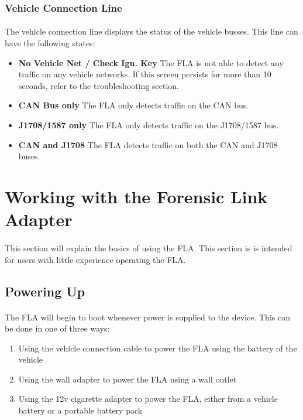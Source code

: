 \documentclass[11pt, oneside]{book}
\begin{document}
\subsubsection{Vehicle Connection Line}
\paragraph{  }
The vehicle connection line displays the status of the vehicle busses.
This line can have the following states:
\begin{itemize}
\item \textbf{No Vehicle Net / Check Ign. Key} The FLA is not able to detect
any traffic on any vehicle networks. If this screen persists for more
than 10 seconds, refer to the troubleshooting section.
\item \textbf{CAN Bus only} The FLA only detects traffic on the CAN bus.
\item \textbf{J1708/1587 only} The FLA only detects traffic on the J1708/1587
bus.
\item \textbf{CAN and J1708} The FLA detects traffic on both the CAN and J1708
buses.
\end{itemize}


\section{Working with the Forensic Link Adapter}
\paragraph{  }
This section will explain the basics of using the FLA. This section is is intended for users with little experience operating the FLA.


\subsection{Powering Up}
\paragraph{  }
The FLA will begin to boot whenever power is supplied to the device. This can be done in one of three ways:
\begin{enumerate}
\item Using the vehicle connection cable to power the FLA using the battery
of the vehicle
\item Using the wall adapter to power the FLA using a wall outlet
\item Using the 12v cigarette adapter to power the FLA, either from a vehicle
battery or a portable battery pack
\end{enumerate}
\end{document}
